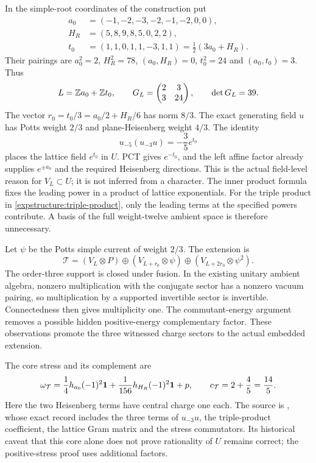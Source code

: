 In the simple-root coordinates of the construction put
\[
\begin{split}
a_0&=(-1,-2,-3,-2,-1,-2,0,0),\\
H_R&=(5,8,9,8,5,0,2,2),\\
t_0&=(1,1,0,1,1,-3,1,1)=\tfrac12(3a_0+H_R).
\end{split}
\]
Their pairings are
$a_0^2=2$, $H_R^2=78$, $(a_0,H_R)=0$, $t_0^2=24$ and
$(a_0,t_0)=3$. Thus
\[
 L=\mathbb Z a_0+\mathbb Z t_0,
 \qquad G_L=\begin{pmatrix}2&3\\3&24\end{pmatrix},
 \qquad \det G_L=39.
\]
The vector $r_0=t_0/3=a_0/2+H_R/6$ has norm $8/3$. The exact
generating field $u$ has Potts weight $2/3$ and plane-Heisenberg
weight $4/3$. The identity
\begin{equation}
 u_{-5}(u_{-3}u)=-\frac35e^{t_0}
 \label{expstructure:triple-product}
\end{equation}
places the lattice field $e^{t_0}$ in $U$. PCT gives $e^{-t_0}$,
and the left affine factor already supplies $e^{\pm a_0}$ and
the required Heisenberg directions. This is the actual field-level
reason for $V_L\subset U$; it is not inferred from a character.
The inner product formula fixes the leading power in a product of
lattice exponentials. For the triple product in
\eqref{expstructure:triple-product}, only the leading terms at the
specified powers contribute. A basis of the full weight-twelve
ambient space is therefore unnecessary.

Let $\psi$ be the Potts simple current of weight $2/3$. The extension
is
\begin{equation}
 \mathcal T=(V_L\otimes P)
 \oplus(V_{L+r_0}\otimes\psi)
 \oplus(V_{L+2r_0}\otimes\psi^2).
 \label{expstructure:T-extension}
\end{equation}
The order-three support is closed under fusion. In the existing
unitary ambient algebra, nonzero multiplication with the conjugate
sector has a nonzero vacuum pairing, so multiplication by a supported
invertible sector is invertible. Connectedness then gives multiplicity
one. The commutant-energy argument removes a possible hidden
positive-energy complementary factor. These observations promote the
three witnessed charge sectors to the actual embedded extension.

The core stress and its complement are
\[
 \omega_{\mathcal T}
 =\frac14h_{a_0}(-1)^2\mathbf1
   +\frac1{156}h_{H_R}(-1)^2\mathbf1+p,
 \qquad c_{\mathcal T}=2+\frac45=\frac{14}5.
\]
Here the two Heisenberg terms have central charge one each. The
source is , whose
exact record includes the three terms of $u_{-3}u$, the triple-product
coefficient, the lattice Gram matrix and the stress commutators.
Its historical caveat that this core alone does not prove rationality
of $U$ remains correct; the positive-stress proof uses additional
factors.

